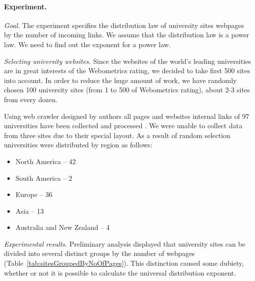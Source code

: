 \paragraph{Experiment.} \textit{Goal.} The experiment specifies the distribution law of university sites webpages by the number of incoming links. We assume that the distribution law is a power law. We need to find out the exponent for a power law.

\textit{Selecting university websites.} Since the websites of the world's leading universities are in great interests of the Webometrics rating, we decided to take first 500 sites into account. In order to reduce the huge amount of work, we have randomly chosen 100 university sites (from 1 to 500 of Webometrics rating), about 2-3 sites from every dozen.

Using web crawler designed by authors all pages and websites internal links of 97 universities have been collected and processed \cite{WebometricsLab}. We were unable to collect data from three sites due to their special layout. As a result of random selection universities were distributed by region as follows:
\begin{itemize}
	\item North America -- 42
	\item South America -- 2
	\item Europe -- 36
	\item Asia -- 13
	\item Australia and New Zealand -- 4
\end{itemize}

\textit{Experimental results.} Preliminary analysis displayed that university sites can be divided into several distinct groups by the number of webpages (Table~\cref{tab:sitesGroupedByNoOfPages}). This distinction caused some dubiety, whether or not it is possible to calculate the universal distribution exponent. 

